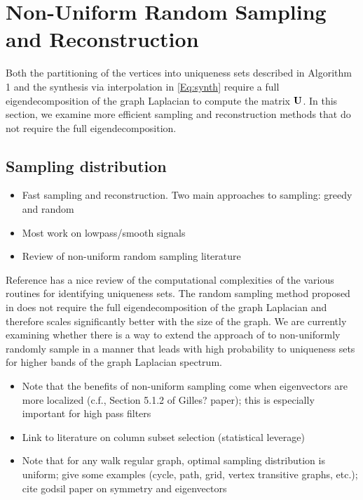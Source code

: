 \documentclass[journal, 10pt]{IEEEtran}
\begin{document}




\section{Non-Uniform Random Sampling and Reconstruction}
Both the partitioning of the vertices into uniqueness sets described in Algorithm 1 and the synthesis via interpolation in \eqref{Eq:synth} require a full eigendecomposition of the graph Laplacian to compute the matrix ${\bf U}$. In this section, we examine more efficient sampling and reconstruction methods that do not require the full eigendecomposition.

{\color{blue}


\subsection{Sampling distribution}

\begin{itemize}
\item Fast sampling and reconstruction. Two main approaches to sampling: greedy and random
\item Most work on lowpass/smooth signals
\item Review of non-uniform random sampling literature
\end{itemize}

Reference \cite{anis2016efficient} has a nice review of the computational complexities of the various routines for identifying uniqueness sets.  The random sampling method proposed in \cite{PuyTGV15} does not require the full eigendecomposition of the graph Laplacian and therefore scales significantly better with the size of the graph.
We are currently examining whether there is a way to extend the approach of \cite{PuyTGV15} to non-uniformly randomly sample in a manner that leads with high probability to uniqueness sets for higher bands of the graph Laplacian spectrum. 
}

{\color{red}
\begin{itemize}
\item Note that the benefits of non-uniform sampling come when eigenvectors are more localized (c.f., Section 5.1.2 of Gilles? paper); this is especially important for high pass filters
\item Link to literature on column subset selection (statistical leverage)
\item Note that for any walk regular graph, optimal sampling distribution is uniform; give some examples (cycle, path, grid, vertex transitive graphs, etc.); cite godsil paper on symmetry and eigenvectors
\end{itemize}
}
\end{document}
